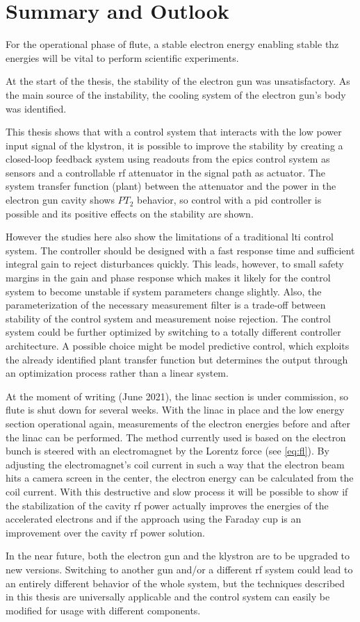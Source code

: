 \chapter{Summary and Outlook}
For the operational phase of \gls{flute}, a stable electron energy enabling stable \gls{thz} energies will be vital to perform scientific experiments.

At the start of the thesis, the stability of the electron gun was unsatisfactory. As the main source of the instability, the cooling system of the electron gun's body was identified.

This thesis shows that with a control system that interacts with the low power input signal of the klystron, it is possible to improve the stability by creating a closed-loop feedback system using readouts from the \gls{epics} control system as sensors and a controllable \gls{rf} attenuator in the signal path as actuator. The system transfer function (plant) between the attenuator and the power in the electron gun cavity shows $PT_2$ behavior, so control with a \gls{pid} controller is possible and its positive effects on the stability are shown.

However the studies here also show the limitations of a traditional \gls{lti} control system. The controller should be designed with a fast response time and sufficient integral gain to reject disturbances quickly. This leads, however, to small safety margins in the gain and phase response which makes it likely for the control system to become unstable if system parameters change slightly. Also, the parameterization of the necessary measurement filter is a trade-off between stability of the control system and measurement noise rejection. The control system could be further optimized by switching to a totally different controller architecture. A possible choice might be model predictive control, which exploits the already identified plant transfer function but determines the output through an optimization process rather than a linear system.

At the moment of writing (June 2021), the \gls{linac} section is under commission, so \gls{flute} is shut down for several weeks. With the \gls{linac} in place and the low energy section operational again, measurements of the electron energies before and after the \gls{linac} can be performed. The method currently used is based on the electron bunch is steered with an electromagnet by the Lorentz force (see \autoref{eq:fl}). By adjusting the electromagnet's coil current in such a way that the electron beam hits a camera screen in the center, the electron energy can be calculated from the coil current. With this destructive and slow process it will be possible to show if the stabilization of the cavity \gls{rf} power actually improves the energies of the accelerated electrons and if the approach using the Faraday cup is an improvement over the cavity \gls{rf} power solution.

In the near future, both the electron gun and the klystron are to be upgraded to new versions. Switching to another gun and/or a different \gls{rf} system could lead to an entirely different behavior of the whole system, but the techniques described in this thesis are universally applicable and the control system can easily be modified for usage with different components.